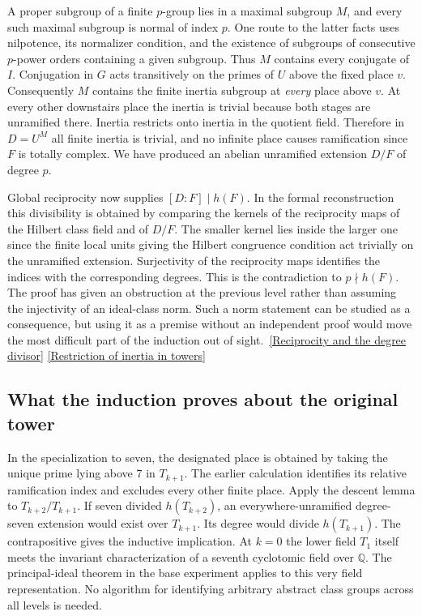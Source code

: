 \documentclass[12pt,letterpaper]{article}
\begin{document}
A proper subgroup of a finite \(p\)-group lies in a maximal subgroup \(M\), and every such maximal subgroup is normal of index \(p\). One route to the latter facts uses nilpotence, its normalizer condition, and the existence of subgroups of consecutive \(p\)-power orders containing a given subgroup. Thus \(M\) contains every conjugate of \(I\). Conjugation in \(G\) acts transitively on the primes of \(U\) above the fixed place \(v\). Consequently \(M\) contains the finite inertia subgroup at \emph{every} place above \(v\). At every other downstairs place the inertia is trivial because both stages are unramified there. Inertia restricts onto inertia in the quotient field. Therefore in \(D=U^M\) all finite inertia is trivial, and no infinite place causes ramification since \(F\) is totally complex. We have produced an abelian unramified extension \(D/F\) of degree \(p\).

Global reciprocity now supplies \([D:F]\mid h(F)\). In the formal reconstruction this divisibility is obtained by comparing the kernels of the reciprocity maps of the Hilbert class field and of \(D/F\). The smaller kernel lies inside the larger one since the finite local units giving the Hilbert congruence condition act trivially on the unramified extension. Surjectivity of the reciprocity maps identifies the indices with the corresponding degrees. This is the contradiction to \(p\nmid h(F)\). The proof has given an obstruction at the previous level rather than assuming the injectivity of an ideal-class norm. Such a norm statement can be studied as a consequence, but using it as a premise without an independent proof would move the most difficult part of the induction out of sight.\
\href{https://github.com/nousentllc/riemann-hypothesis/blob/e674cb750ef96b2f5e7cd46586ea4edb9998715a/research/uriel/experiments/ascent-witness/ClassAscent.lean#L145-L174}{[Reciprocity and the degree divisor]}\quad
\href{https://github.com/nousentllc/riemann-hypothesis/blob/40e56bab026552e089d7afcfeff08d2defb9c005/src/GroundTheory/GlobalFields/Artin/InflationTower.lean}{[Restriction of inertia in towers]}

\subsection{What the induction proves about the original tower}

In the specialization to seven, the designated place is obtained by taking the unique prime lying above 7 in \(T_{k+1}\). The earlier calculation identifies its relative ramification index and excludes every other finite place. Apply the descent lemma to \(T_{k+2}/T_{k+1}\). If seven divided \(h(T_{k+2})\), an everywhere-unramified degree-seven extension would exist over \(T_{k+1}\). Its degree would divide \(h(T_{k+1})\). The contrapositive gives the inductive implication. At \(k=0\) the lower field \(T_1\) itself meets the invariant characterization of a seventh cyclotomic field over \(\mathbb Q\). The principal-ideal theorem in the base experiment applies to this very field representation. No algorithm for identifying arbitrary abstract class groups across all levels is needed.
\end{document}
